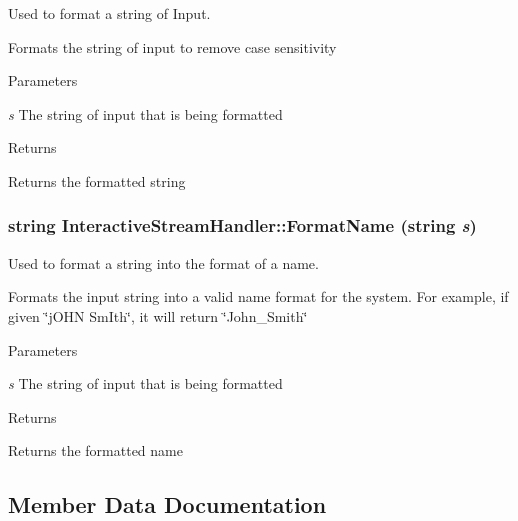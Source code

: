 Used to format a string of Input. 

Formats the string of input to remove case sensitivity


\begin{DoxyParams}{Parameters}
\item[{\em s}]The string of input that is being formatted\end{DoxyParams}
\begin{DoxyReturn}{Returns}

\end{DoxyReturn}
Returns the formatted string \hypertarget{classInteractiveStreamHandler_a757903776017c997963b67a23c1a2a1e}{
\subsubsection[{FormatName}]{\setlength{\rightskip}{0pt plus 5cm}string InteractiveStreamHandler::FormatName (string {\em s})}}
\label{classInteractiveStreamHandler_a757903776017c997963b67a23c1a2a1e}


Used to format a string into the format of a name. 

Formats the input string into a valid name format for the system. For example, if given \char`\"{}jOHN SmIth\char`\"{}, it will return \char`\"{}John\_\-Smith\char`\"{}


\begin{DoxyParams}{Parameters}
\item[{\em s}]The string of input that is being formatted\end{DoxyParams}
\begin{DoxyReturn}{Returns}

\end{DoxyReturn}
Returns the formatted name 

\subsection{Member Data Documentation}
\hypertarget{classInteractiveStreamHandler_a48a8d769c4e9b47f782adf1a3f515477}{
\subsubsection[{cba\_\-directory}]{}}
\label{classInteractiveStreamHandler_a48a8d769c4e9b47f782adf1a3f515477}


